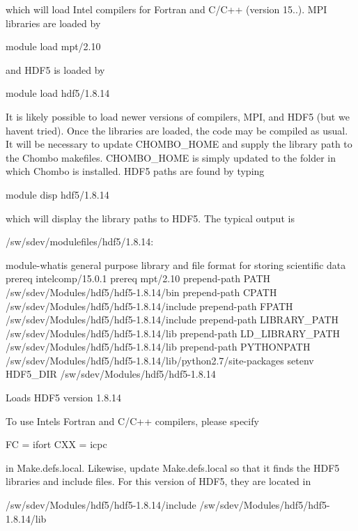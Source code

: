 which will load Intel compilers for Fortran and C/\+C++ (version 15..). M\+PI libraries are loaded by \begin{DoxyVerb}module load mpt/2.10
\end{DoxyVerb}


and H\+D\+F5 is loaded by \begin{DoxyVerb}module load hdf5/1.8.14
\end{DoxyVerb}


It is likely possible to load newer versions of compilers, M\+PI, and H\+D\+F5 (but we haven\textquotesingle{}t tried). Once the libraries are loaded, the code may be compiled as usual. It will be necessary to update C\+H\+O\+M\+B\+O\+\_\+\+H\+O\+ME and supply the library path to the Chombo makefiles. C\+H\+O\+M\+B\+O\+\_\+\+H\+O\+ME is simply updated to the folder in which Chombo is installed. H\+D\+F5 paths are found by typing \begin{DoxyVerb}module disp hdf5/1.8.14
\end{DoxyVerb}


which will display the library paths to H\+D\+F5. The typical output is \begin{DoxyVerb}/sw/sdev/modulefiles/hdf5/1.8.14:

module-whatis    general purpose library and file format for storing scientific data 
prereq   intelcomp/15.0.1 
prereq   mpt/2.10 
prepend-path     PATH /sw/sdev/Modules/hdf5/hdf5-1.8.14/bin 
prepend-path     CPATH /sw/sdev/Modules/hdf5/hdf5-1.8.14/include 
prepend-path     FPATH /sw/sdev/Modules/hdf5/hdf5-1.8.14/include 
prepend-path     LIBRARY_PATH /sw/sdev/Modules/hdf5/hdf5-1.8.14/lib 
prepend-path     LD_LIBRARY_PATH /sw/sdev/Modules/hdf5/hdf5-1.8.14/lib 
prepend-path     PYTHONPATH /sw/sdev/Modules/hdf5/hdf5-1.8.14/lib/python2.7/site-packages 
setenv           HDF5_DIR /sw/sdev/Modules/hdf5/hdf5-1.8.14 

Loads HDF5 version 1.8.14
\end{DoxyVerb}


To use Intel\textquotesingle{}s Fortran and C/\+C++ compilers, please specify \begin{DoxyVerb} FC  = ifort
 CXX = icpc
\end{DoxyVerb}


in Make.\+defs.\+local. Likewise, update Make.\+defs.\+local so that it finds the H\+D\+F5 libraries and include files. For this version of H\+D\+F5, they are located in \begin{DoxyVerb} /sw/sdev/Modules/hdf5/hdf5-1.8.14/include 
 /sw/sdev/Modules/hdf5/hdf5-1.8.14/lib 
\end{DoxyVerb}


